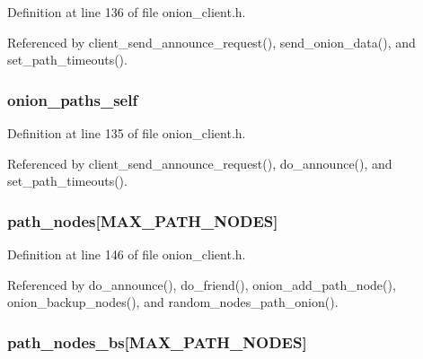 Definition at line 136 of file onion\+\_\+client.\+h.



Referenced by client\+\_\+send\+\_\+announce\+\_\+request(), send\+\_\+onion\+\_\+data(), and set\+\_\+path\+\_\+timeouts().

\hypertarget{struct_onion___client_a917f02fe81d007c9668083e0ac9ff0c7}{
\subsubsection[{onion\+\_\+paths\+\_\+self}]{ onion\+\_\+paths\+\_\+self}}\label{struct_onion___client_a917f02fe81d007c9668083e0ac9ff0c7}


Definition at line 135 of file onion\+\_\+client.\+h.



Referenced by client\+\_\+send\+\_\+announce\+\_\+request(), do\+\_\+announce(), and set\+\_\+path\+\_\+timeouts().

\hypertarget{struct_onion___client_a1baee18cb7db8dad6b0847fa977b7f16}{
\subsubsection[{path\+\_\+nodes}]{ path\+\_\+nodes\mbox{[}{\bf M\+A\+X\+\_\+\+P\+A\+T\+H\+\_\+\+N\+O\+D\+E\+S}\mbox{]}}}\label{struct_onion___client_a1baee18cb7db8dad6b0847fa977b7f16}


Definition at line 146 of file onion\+\_\+client.\+h.



Referenced by do\+\_\+announce(), do\+\_\+friend(), onion\+\_\+add\+\_\+path\+\_\+node(), onion\+\_\+backup\+\_\+nodes(), and random\+\_\+nodes\+\_\+path\+\_\+onion().

\hypertarget{struct_onion___client_adc82bddd48395ce29a9d609cd6f39a12}{
\subsubsection[{path\+\_\+nodes\+\_\+bs}]{ path\+\_\+nodes\+\_\+bs\mbox{[}{\bf M\+A\+X\+\_\+\+P\+A\+T\+H\+\_\+\+N\+O\+D\+E\+S}\mbox{]}}}\label{struct_onion___client_adc82bddd48395ce29a9d609cd6f39a12}


